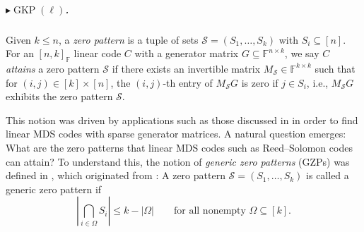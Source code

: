 \documentclass[11pt]{article}
\theoremstyle{plain}
\theoremstyle{definition}
\theoremstyle{remark}
\newcommand{\F}{\mathbb{F}}
\begin{document}

\subparagraph{$\blacktriangleright\operatorname{GKP}(\ell)$.}

Given $k\leq n$, a \emph{zero pattern} is a tuple of sets $\mathcal{S}=(S_1,\dots,S_k)$ with $S_i\subseteq [n]$.
For an $[n,k]_{\F}$ linear code $C$ with a generator matrix $G\subseteq \F^{n\times k}$, we say $C$ \emph{attains} a zero pattern $\mathcal{S}$ if there exists an invertible matrix $M_{\mathcal{S}}\in\F^{k\times k}$ such that for $(i,j)\in [k]\times [n]$, the $(i,j)$-th entry of $M_{\mathcal{S}} G$ is zero if $j\in S_i$, i.e., $M_{\mathcal{S}} G$ exhibits the zero pattern $\mathcal{S}$.

This notion was driven by applications such as those discussed in \cite{dau2014simple,yan2013algorithms,yan2014weakly} in order to find linear MDS codes with sparse generator matrices.
A natural question emerges: What are the zero patterns that linear MDS codes such as Reed--Solomon codes can attain? To understand this, the notion of \emph{generic zero patterns} (GZPs) was defined in \cite{brakensiek2023generic}, which originated from \cite{dau2014simple}: A zero pattern $\mathcal{S}=(S_1,\ldots,S_k)$ is called a generic zero pattern if 
\begin{equation}\label{eq:gzp}
\left|\bigcap_{i\in \Omega} S_i\right|\leq k-|\Omega| \qquad \text{for all nonempty } \Omega\subseteq [k].
\end{equation}
\end{document}
